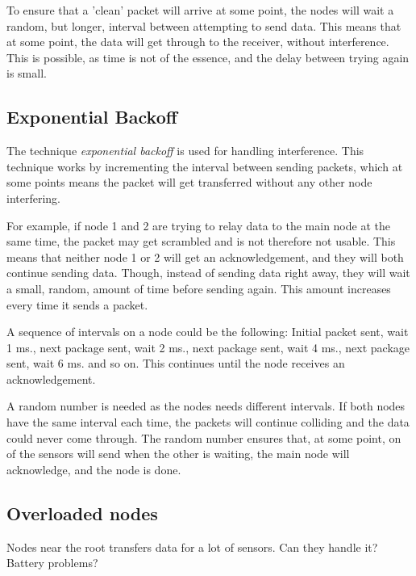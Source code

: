 To ensure that a 'clean' packet will arrive at some point, the nodes will wait a random, but longer, interval between attempting to send data. This means that at some point, the data will get through to the receiver, without interference.
This is possible, as time is not of the essence, and the delay between trying again is small.

\subsection*{Exponential Backoff}
The technique \textit{exponential backoff} is used for handling interference. This technique works by incrementing the interval between sending packets, which at some points means the packet will get transferred without any other node interfering. 

For example, if node 1 and 2 are trying to relay data to the main node at the same time, the packet may get scrambled and is not therefore not usable. This means that neither node 1 or 2 will get an acknowledgement, and they will both continue sending data. Though, instead of sending data right away, they will wait a small, random, amount of time before sending again. This amount increases every time it sends a packet. 

A sequence of intervals on a node could be the following: Initial packet sent, wait 1 ms., next package sent, wait 2 ms.,  next package sent, wait 4 ms., next package sent, wait 6 ms. and so on. This continues until the node receives an acknowledgement.

A random number is needed as the nodes needs different intervals. If both nodes have the same interval each time, the packets will continue colliding and the data could never come through. The random number ensures that, at some point, on of the sensors will send when the other is waiting, the main node will acknowledge, and the node is done. 

\subsection{Overloaded nodes}
Nodes near the root transfers data for a lot of sensors. Can they handle it? Battery problems?

